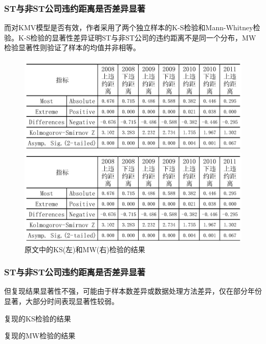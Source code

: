 \documentclass{ctexbeamer}
\begin{document}
\begin{frame}
    \frametitle{ ST与非ST公司违约距离是否差异显著}
    而对KMV模型是否有效，作者采用了两个独立样本的K-S检验和Mann-Whitney检验。K-S检验的显著性差异证明ST与非ST公司的违约距离不是同一个分布，MW检验显著性则验证了样本的均值并非相等。
    \begin{figure}[H]
        \begin{minipage}{0.48\linewidth}
            \includegraphics[width=\linewidth]{img/ks.jpeg}
        \end{minipage}
        \begin{minipage}{0.48\linewidth}
            \includegraphics[width=\linewidth]{img/mw.jpeg}
        \end{minipage}
        \caption{原文中的KS(左)和MW(右)检验的结果}\label{fig:origin}
    \end{figure}
\end{frame}
\begin{frame}
    \frametitle{ ST与非ST公司违约距离是否差异显著}

    但复现结果显著性不强，可能由于样本数差异或数据处理方法差异，仅在部分年份显著，大部分时间表现显著性较弱。
    \begin{table}
        \tiny
        \caption{复现的KS检验的结果}
    \end{table}
    \begin{table}
        \tiny
        \caption{复现的MW检验的结果}
    \end{table}
\end{frame}
\end{document}
